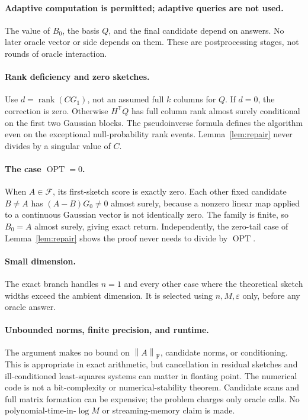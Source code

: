 \documentclass[11pt]{article}
\numberwithin{equation}{section}
\theoremstyle{remark}
\newcommand{\F}{\mathcal F}
\newcommand{\OPT}{\operatorname{OPT}}
\newcommand{\rank}{\operatorname{rank}}
\newcommand{\norm}[1]{\left\lVert #1\right\rVert_{\mathrm F}}
\newcommand{\T}{\mathsf T}
\begin{document}
\paragraph{Adaptive computation is permitted; adaptive queries are not used.}
The value of $B_0$, the basis $Q$, and the final candidate depend on answers. No later oracle vector or side depends on them. These are postprocessing stages, not rounds of oracle interaction.

\paragraph{Rank deficiency and zero sketches.}
Use $d=\rank(CG_1)$, not an assumed full $k$ columns for $Q$. If $d=0$, the correction is zero. Otherwise $H^\T Q$ has full column rank almost surely conditional on the first two Gaussian blocks. The pseudoinverse formula defines the algorithm even on the exceptional null-probability rank events. Lemma~\ref{lem:repair} never divides by a singular value of $C$.

\paragraph{The case $\OPT=0$.}
When $A\in\F$, its first-sketch score is exactly zero. Each other fixed candidate $B\ne A$ has $(A-B)G_0\ne0$ almost surely, because a nonzero linear map applied to a continuous Gaussian vector is not identically zero. The family is finite, so $B_0=A$ almost surely, giving exact return. Independently, the zero-tail case of Lemma~\ref{lem:repair} shows the proof never needs to divide by $\OPT$.

\paragraph{Small dimension.}
The exact branch handles $n=1$ and every other case where the theoretical sketch widths exceed the ambient dimension. It is selected using $n,M,\varepsilon$ only, before any oracle answer.

\paragraph{Unbounded norms, finite precision, and runtime.}
The argument makes no bound on $\norm A$, candidate norms, or conditioning. This is appropriate in exact arithmetic, but cancellation in residual sketches and ill-conditioned least-squares systems can matter in floating point. The numerical code is not a bit-complexity or numerical-stability theorem. Candidate scans and full matrix formation can be expensive; the problem charges only oracle calls. No polynomial-time-in-$\log M$ or streaming-memory claim is made.
\end{document}

